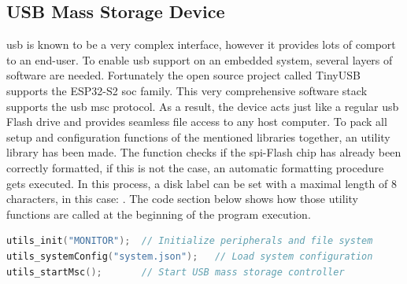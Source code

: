 \subsection{USB Mass Storage Device}
\acrshort{usb} is known to be a very complex interface, however it provides lots of comport to an end-user. To enable \acrshort{usb} support on an embedded system, several layers of software are needed. Fortunately the open source project called TinyUSB supports the ESP32-S2 \acrshort{soc} family. This very comprehensive software stack supports the \acrshort{usb} \acrfull{msc} protocol.
As a result, the device acts just like a regular \acrshort{usb} Flash drive and provides seamless file access to any host computer. \newline
To pack all setup and configuration functions of the mentioned libraries together, an utility library has been made. The  function checks if the \acrshort{spi}-Flash chip has already been correctly formatted, if this is not the case, an automatic formatting procedure gets executed. In this process, a disk label can be set with a maximal length of 8 characters, in this case: . The code section below shows how those utility functions are called at the beginning of the program execution.

\bigskip
{}
\begin{lstlisting}[backgroundcolor=\color{gray!10},  
                   basicstyle=\ttfamily,
                   columns=fullflexible,
                   breakatwhitespace=false,      
                   breaklines=true,                
                   captionpos=b,                    
                   commentstyle=\color{mygreen}, 
                   extendedchars=true,              
                   frame=single,                   
                   keepspaces=true,             
                   keywordstyle=\color{blue},      
                   language=c++,                 
                   numbers=none,                
                   numbersep=5pt,                   
                   numberstyle=\tiny\color{blue}, 
                   rulecolor=\color{mygray},        
                   showspaces=false,
                   showstringspaces=false,
                   showtabs=false,                 
                   stepnumber=5,                  
                   stringstyle=\color{mymauve},    
                   tabsize=2,                      
                   title=\lstname,
                   frame=none,
                   xleftmargin = 1cm,
                   framexleftmargin = 1em]
utils_init("MONITOR");  // Initialize peripherals and file system
utils_systemConfig("system.json");   // Load system configuration
utils_startMsc();       // Start USB mass storage controller
\end{lstlisting}

